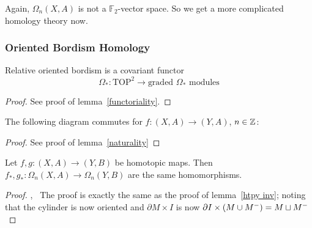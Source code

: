 \documentclass[a4paper,12pt]{article}
\begin{document}
Again, \(\Omega_n(X,A)\) is not a \(\mathbb{F}_2\)-vector space. So we get a more complicated homology theory now.

\subsubsection{Oriented Bordism Homology}

\begin{lemma}
    Relative oriented bordism is a covariant functor
    \[\Omega_\ast:\mathrm{TOP}^2\to\text{graded }\Omega_\ast\text{ modules}\]
\end{lemma}

\begin{proof}
    See proof of lemma\ \ref{functoriality}.
\end{proof}

\begin{lemma}
    The following diagram commutes for \(f:(X,A)\to(Y,A)\), \(n\in\mathbb{Z}\):
    \begin{center}
    \end{center}
\end{lemma}

\begin{proof}
    See proof of lemma\ \ref{naturality}
\end{proof}

\begin{lemma}
    Let \(f,g:(X,A)\to(Y,B)\) be homotopic maps. Then \(f_\ast,g_\ast:\Omega_n(X,A)\to\Omega_n(Y,B)\) are the same homomorphisms.
\end{lemma}

\begin{proof}\cite{atiyah},\ \cite{conner}
    The proof is exactly the same as the proof of lemma\ \ref{htpy inv}; noting that the cylinder is now oriented and \(\partial M\times I\) is now \(\partial I\times (M\cup M^-)=M\sqcup M^-\)%
\end{proof}
\end{document}
